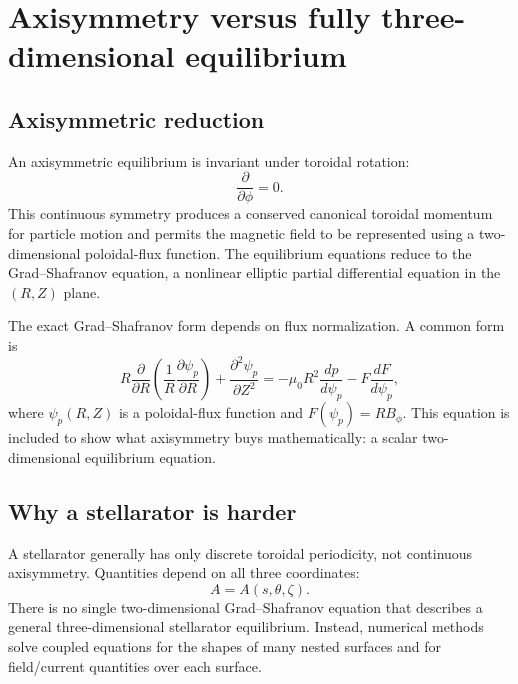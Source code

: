\section{Axisymmetry versus fully three-dimensional equilibrium}
\label{sec:axisymmetry_vs_3d}

\subsection{Axisymmetric reduction}
An axisymmetric equilibrium is invariant under toroidal rotation:
\begin{equation}
\frac{\partial}{\partial\phi}=0.
\end{equation}
This continuous symmetry produces a conserved canonical toroidal momentum for particle motion and permits the magnetic field to be represented using a two-dimensional poloidal-flux function. The equilibrium equations reduce to the Grad--Shafranov equation, a nonlinear elliptic partial differential equation in the $(R,Z)$ plane.

The exact Grad--Shafranov form depends on flux normalization. A common form is
\begin{equation}
R\frac{\partial}{\partial R}
\left(\frac{1}{R}\frac{\partial\psi_p}{\partial R}\right)
+\frac{\partial^2\psi_p}{\partial Z^2}
=-\mu_0R^2\frac{dp}{d\psi_p}
-F\frac{dF}{d\psi_p},
\label{eq:grad_shafranov}
\end{equation}
where $\psi_p(R,Z)$ is a poloidal-flux function and $F(\psi_p)=RB_\phi$. This equation is included to show what axisymmetry buys mathematically: a scalar two-dimensional equilibrium equation.

\subsection{Why a stellarator is harder}
A stellarator generally has only discrete toroidal periodicity, not continuous axisymmetry. Quantities depend on all three coordinates:
\begin{equation}
A=A(s,\theta,\zeta).
\end{equation}
There is no single two-dimensional Grad--Shafranov equation that describes a general three-dimensional stellarator equilibrium. Instead, numerical methods solve coupled equations for the shapes of many nested surfaces and for field/current quantities over each surface.

